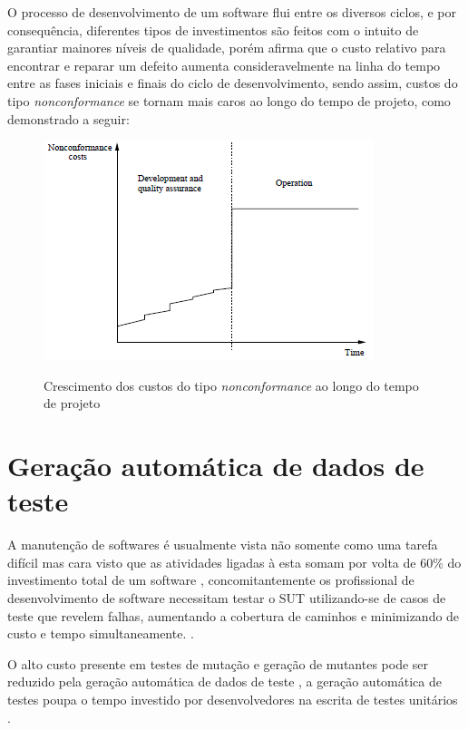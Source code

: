 \documentclass[
	12pt,				%
	oneside,			%
	a4paper,			%
	english,			%
	brazil				%
	]{abntex2ppgsi}
\begin{document}
O processo de desenvolvimento de um software flui entre os diversos ciclos, e por consequência, diferentes tipos de investimentos são feitos com o intuito de garantiar mainores níveis de qualidade, porém \cite{pressman2009engenharia} afirma que o custo relativo para encontrar e reparar um defeito aumenta consideravelmente na linha do tempo entre as fases iniciais e finais do ciclo de desenvolvimento, sendo assim, custos do tipo \textit{nonconformance} se tornam mais caros ao longo do tempo de projeto, como demonstrado a seguir:

\begin{figure}[H]%
	\centering
 	  \caption{Crescimento dos custos do tipo \textit{nonconformance} ao longo do tempo de projeto}
		\includegraphics{nonconformance-costs-timeline.png}
	\label{fig:framework-teste}
\end{figure}




\chapter{Geração automática de dados de teste}
A manutenção de softwares é usualmente vista não somente como uma tarefa difícil mas cara visto que as atividades ligadas à esta somam por volta de 60\% do investimento total de um software \cite{shamshiri2018}, concomitantemente os profissional de desenvolvimento de software necessitam testar o SUT utilizando-se de casos de teste que revelem falhas, aumentando a cobertura de caminhos e minimizando de custo e tempo simultaneamente. \cite{dave2015}.

O alto custo presente em testes de mutação e geração de mutantes pode ser reduzido pela geração automática de dados de teste \cite{dave2015}, a geração automática de testes poupa o tempo investido por desenvolvedores na escrita de testes unitários \cite{shamshiri2018}.
\end{document}

